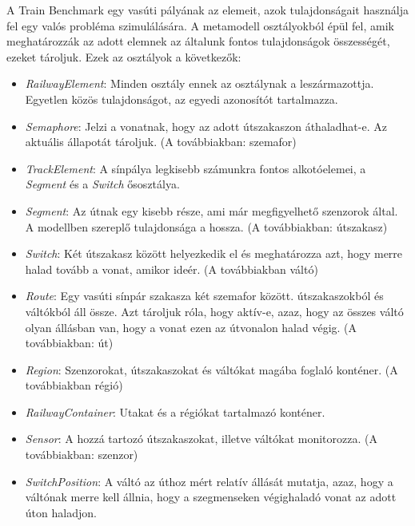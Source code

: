 A Train Benchmark egy vasúti pályának az elemeit, azok tulajdonságait használja fel egy valós probléma szimulálására. A metamodell osztályokból épül fel, amik meghatározzák az adott elemnek az általunk fontos tulajdonságok összességét, ezeket tároljuk. Ezek az osztályok a következők:
\begin{itemize}
	\item \emph{RailwayElement}: Minden osztály ennek az osztálynak a leszármazottja. Egyetlen közös tulajdonságot, az egyedi azonosítót tartalmazza.
	\item \emph{Semaphore}: Jelzi a vonatnak, hogy az adott útszakaszon áthaladhat-e. Az aktuális állapotát tároljuk. (A továbbiakban: szemafor)
	\item \emph{TrackElement}: A sínpálya legkisebb számunkra fontos alkotóelemei, a \emph{Segment} és a \emph{Switch} ősosztálya.
	\item \emph{Segment}: Az útnak egy kisebb része, ami már megfigyelhető szenzorok által. A modellben szereplő tulajdonsága a hossza. (A továbbiakban: útszakasz)
	\item \emph{Switch}: Két útszakasz között helyezkedik el és meghatározza azt, hogy merre halad tovább a vonat, amikor ideér. (A továbbiakban váltó)
	\item \emph{Route}: Egy vasúti sínpár szakasza két szemafor között. útszakaszokból és váltókból áll össze. Azt tároljuk róla, hogy aktív-e, azaz, hogy az összes váltó olyan állásban van, hogy a vonat ezen az útvonalon halad végig. (A továbbiakban: út)
	\item \emph{Region}: Szenzorokat, útszakaszokat és váltókat magába foglaló konténer. (A továbbiakban régió)
	\item \emph{RailwayContainer}: Utakat és a régiókat tartalmazó konténer.
	\item \emph{Sensor}: A hozzá tartozó útszakaszokat, illetve váltókat monitorozza. (A továbbiakban: szenzor)
	\item \emph{SwitchPosition}: A váltó az úthoz mért relatív állását mutatja, azaz, hogy a váltónak merre kell állnia, hogy a szegmenseken végighaladó vonat az adott úton haladjon. 
\end{itemize}

